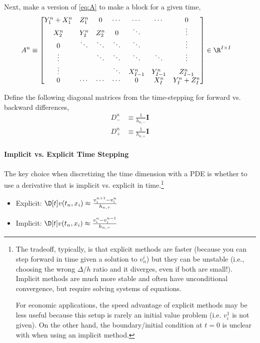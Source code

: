 \documentclass[11pt]{etk-article}
\begin{document}
Next, make a version of \cref{eq:A} to make a block for a given time,
\begin{align}
A^n &\equiv \begin{bmatrix}
Y^n_1 + X^n_1 & Z^n_1 & 0 & \cdots & \cdots & \cdots & 0 \\
X^n_2 & Y^n_2 & Z^n_2 & 0 & \ddots& & \vdots \\
0 & \ddots & \ddots & \ddots & \ddots &  & \vdots \\
\vdots & &\ddots & \ddots & \ddots & \ddots  & \vdots \\
\vdots & & & \ddots & X^n_{I-1} & Y^n_{I-1}  & Z^n_{I-1} \\
0 & \cdots & \cdots & \cdots & 0 & X^n_I & Y^n_I+Z^n_I\\
\end{bmatrix}\in\R^{I\times I}\label{eq:A-t}
\end{align}

Define the following diagonal matrices from the time-stepping for forward vs. backward differences,
\begin{align}
D_{-}^n &\equiv \frac{1}{h_{n,-}} \mathbf{I}\\
D_{+}^n &\equiv \frac{1}{h_{n,+}} \mathbf{I}
\end{align}

\paragraph{Implicit vs. Explicit Time Stepping}
The key choice when discretizing the time dimension with a PDE is whether to use a derivative that is implicit vs. explicit in time.\footnote{The tradeoff, typically, is that explicit methods are faster (because you can step forward in time given a solution to $v_n^i$) but they can be unstable (i.e., choosing the wrong $\Delta/h$ ratio and it diverges, even if both are small!).  Implicit methods are much more stable and often have unconditional convergence, but require solving systems of equations.
	
	For economic applications, the speed advantage of explicit methods may be less useful because this setup is rarely an initial value problem (i.e. $v^1_i$ is not given).  On the other hand, the boundary/initial condition at $t=0$ is unclear with when using an implicit method.}
\begin{itemize}
	\item Explicit: $\D[t]v(t_n,x_i) \approx \frac{v^{n+1}_i - v^n_i}{h_{n,+}}$
	\item Implicit: $\D[t]v(t_n,x_i) \approx \frac{v^n_i - v^{n-1}_i}{h_{n,-}}$
\end{itemize}
\end{document}
